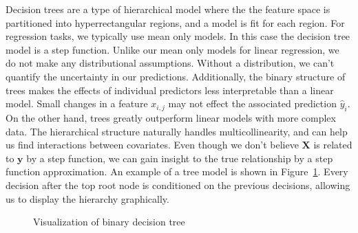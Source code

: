 \documentclass[
  12pt,
  letterpaper,
  DIV=11,
  numbers=noendperiod]{scrartcl}
\newcommand{\bm}{\mathbf}
\begin{document}
Decision trees are a type of hierarchical model where the the feature
space is partitioned into hyperrectangular regions, and a model is fit
for each region. For regression tasks, we typically use mean only
models. In this case the decision tree model is a step function. Unlike
our mean only models for linear regression, we do not make any
distributional assumptions. Without a distribution, we can't quantify
the uncertainty in our predictions. Additionally, the binary structure
of trees makes the effects of individual predictors less interpretable
than a linear model. Small changes in a feature \(x_{i,j}\) may not
effect the associated prediction \(\hat y_i\). On the other hand, trees
greatly outperform linear models with more complex data. The
hierarchical structure naturally handles multicollinearity, and can help
us find interactions between covariates. Even though we don't believe
\(\bm X\) is related to \(\bm y\) by a step function, we can gain
insight to the true relationship by a step function approximation. An
example of a tree model is shown in Figure~\ref{fig-tree-examp}. Every
decision after the top root node is conditioned on the previous
decisions, allowing us to display the hierarchy graphically.

\begin{figure}[H]


\caption{\label{fig-tree-examp}Visualization of binary decision tree}

\end{figure}%
\end{document}
